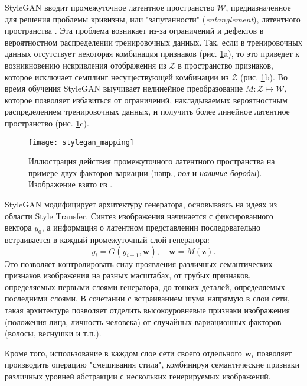 StyleGAN вводит промежуточное латентное пространство $\mathcal W$, предназначенное для решения проблемы кривизны, или "запутанности" \foreignlanguage{english}{(\emph{entanglement})}, латентного пространства \cite{arvanitidis2018oddity}. 
Эта проблема возникает из-за ограничений и дефектов в вероятностном распределении тренировочных данных.
Так, если в тренировочных данных отсутствует некоторая комбинация признаков (рис. \ref{fig:stylegan-mapping}a), то это приведет к возникновению искривления отображения из $\mathcal Z$ в пространство признаков, которое исключает семплинг несуществующей комбинации из $\mathcal Z$ (рис. \ref{fig:stylegan-mapping}b). 
Во время обучения StyleGAN выучивает нелинейное преобразование $M: \mathcal Z \mapsto \mathcal W$, которое позволяет избавиться от ограничений, накладываемых вероятностным распределением тренировочных данных, и получить более линейное латентное пространство  (рис. \ref{fig:stylegan-mapping}c).

\begin{figure}[h]
\begin{center}
    \texttt{[image: stylegan\_mapping]}
    \caption{Иллюстрация действия промежуточного латентного пространства на примере двух факторов вариации (напр., \emph{пол} и \emph{наличие бороды}). Изображение взято из \cite{StyleGAN}.}
    \label{fig:stylegan-mapping}
\end{center}
\end{figure}

StyleGAN модифицирует архитектуру генератора, основываясь на идеях из области Style Transfer. 
Синтез изображения начинается с фиксированного вектора $y_0$, а информация о латентном представлении последовательно встраивается в каждый промежуточный слой генератора:
$$ y_i = G(y_{i-1}, \mathbf w),\quad \mathbf w = M(\mathbf z). $$
Это позволяет контролировать силу проявления различных семантических признаков изображения на разных масштабах, от грубых признаков, определяемых первыми слоями генератора, до тонких деталей, определяемых последними слоями.
В сочетании с встраиванием шума напрямую в слои сети, такая архитектура позволяет отделить высокоуровневые признаки изображения (положения лица, личность человека) от случайных вариационных факторов (волосы, веснушки и т.п.).

Кроме того, использование в каждом слое сети своего отдельного $\mathbf w_i$ позволяет производить операцию "смешивания стиля", комбинируя семантические признаки различных уровней абстракции с нескольких генерируемых изображений.

